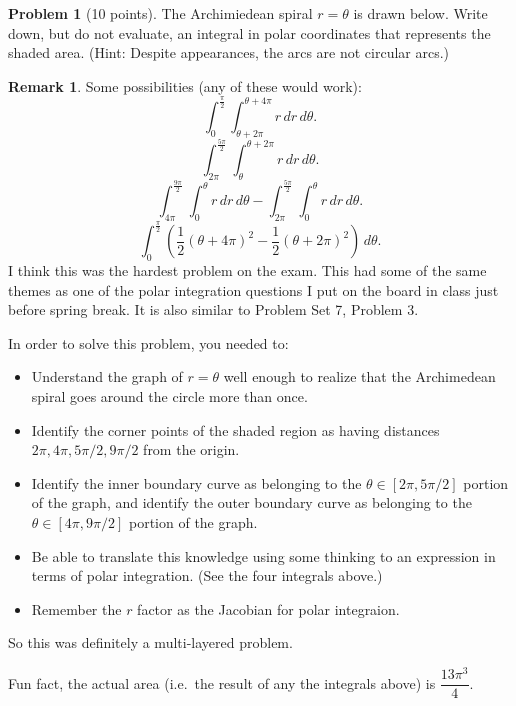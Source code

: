\documentclass[11pt,oneside]{amsart}
\theoremstyle{definition}
\newtheorem{problem}{Problem}
\newtheorem*{remark}{Remark}
\theoremstyle{plain}
\begin{document}
\begin{problem}[10 points]
  The Archimiedean spiral $r=\theta$ is drawn below. Write down, but do not evaluate, an integral in polar coordinates that represents the shaded area. (Hint: Despite appearances, the arcs are not circular arcs.)
  \begin{center}
  \end{center}
\end{problem}
\begin{remark}\color{blue}
  Some possibilities (any of these would work):
  \[\int_0^{\frac{\pi}{2}}\int_{\theta+2\pi}^{\theta+4\pi}r\,dr\,d\theta.\]
  \[\int_{2\pi}^{\frac{5\pi}{2}}\int_{\theta}^{\theta+2\pi}r\,dr\,d\theta.\]
  \[\int_{4\pi}^{\frac{9\pi}2}\int_0^\theta r\,dr\,d\theta-\int_{2\pi}^{\frac{5\pi}2}\int_0^\theta r\,dr\,d\theta.\]
  \[\int_0^{\frac{\pi}2}\left(\frac12(\theta+4\pi)^2-\frac12(\theta+2\pi)^2\right)\,d\theta.\]
  I think this was the hardest problem on the exam. This had some of the same themes as one of the polar integration questions I put on the board in class just before spring break. It is also similar to Problem Set 7, Problem 3.

  In order to solve this problem, you needed to:
  \begin{itemize}
    \item Understand the graph of $r=\theta$ well enough to realize that the Archimedean spiral goes around the circle more than once.
    \item Identify the corner points of the shaded region as having distances $2\pi,4\pi,5\pi/2,9\pi/2$ from the origin.
    \item Identify the inner boundary curve as belonging to the $\theta\in [2\pi,5\pi/2]$ portion of the graph, and identify the outer boundary curve as belonging to the $\theta\in [4\pi,9\pi/2]$ portion of the graph.
    \item Be able to translate this knowledge using some thinking to an expression in terms of polar integration. (See the four integrals above.)
    \item Remember the $r$ factor as the Jacobian for polar integraion.
  \end{itemize}
  So this was definitely a multi-layered problem.

  Fun fact, the actual area (i.e.\ the result of any the integrals above) is $\dfrac{13\pi^3}4$.
\end{remark}
\end{document}
